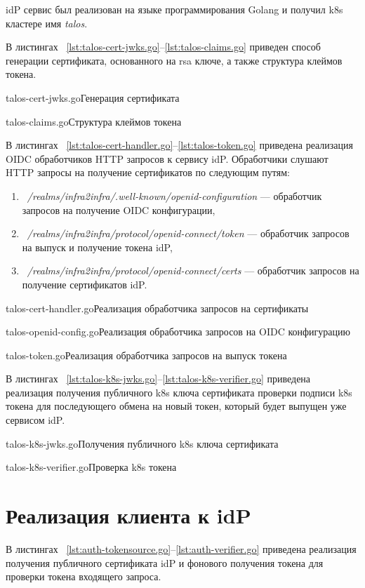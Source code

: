 idP сервис был реализован на языке программирования Golang и получил k8s кластере имя \textit{talos}.

В листингах ~\ref{lst:talos-cert-jwks.go}--\ref{lst:talos-claims.go} приведен способ генерации сертификата, основанного на rsa ключе, а также структура клеймов токена.

	{talos-cert-jwks.go}{Генерация сертификата}

	{talos-claims.go}{Структура клеймов токена}

В листингах ~\ref{lst:talos-cert-handler.go}--\ref{lst:talos-token.go} приведена реализация OIDC обработчиков HTTP запросов к сервису idP.
Обработчики слушают HTTP запросы на получение сертификатов по следующим путям:
\begin{enumerate}
\item ~\textit{/realms/infra2infra/.well-known/openid-configuration} --- обработчик запросов на получение OIDC конфигурации,
\item ~\textit{/realms/infra2infra/protocol/openid-connect/token} --- обработчик запросов на выпуск и получение токена idP,
\item ~\textit{/realms/infra2infra/protocol/openid-connect/certs} --- обработчик запросов на получение сертификатов idP.
\end{enumerate}

	{talos-cert-handler.go}{Реализация обработчика запросов на сертификаты}
	
	{talos-openid-config.go}{Реализация обработчика запросов на OIDC конфигурацию}	

	{talos-token.go}{Реализация обработчика запросов на выпуск токена}

В листингах ~\ref{lst:talos-k8s-jwks.go}--\ref{lst:talos-k8s-verifier.go} приведена реализация получения публичного k8s ключа сертификата проверки подписи k8s токена для последующего обмена на новый токен, который будет выпущен уже сервисом idP.

	{talos-k8s-jwks.go}{Получения публичного k8s ключа сертификата}

	{talos-k8s-verifier.go}{Проверка k8s токена}


\section{Реализация клиента к idP}
В листингах ~\ref{lst:auth-tokensource.go}--\ref{lst:auth-verifier.go} приведена реализация получения публичного сертификата idP и фонового получения токена для проверки токена входящего запроса.

